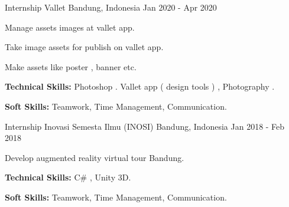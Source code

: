 \begin{cventries}
        
  \cventry
    {Internship} %
    {Vallet} %
    {Bandung, Indonesia} %
    {Jan 2020 - Apr 2020} %
    {
      \begin{cvitems} %
        \item {Manage assets images at vallet app.}
        \item {Take image assets for publish on vallet app.}
        \item {Make assets like poster , banner etc.}
        \item {\textbf{Technical Skills:} Photoshop . Vallet app ( design tools ) , Photography .}
        \item {\textbf{Soft Skills:} Teamwork, Time Management, Communication.}
      \end{cvitems}
    }
    
  \cventry
    {Internship} %
    {Inovasi Semesta Ilmu (INOSI)} %
    {Bandung, Indonesia} %
    {Jan 2018 - Feb 2018} %
    {
      \begin{cvitems} %
        \item {Develop augmented reality virtual tour Bandung.}
        \item {\textbf{Technical Skills:} C\#  , Unity 3D.}
        \item {\textbf{Soft Skills:} Teamwork, Time Management, Communication.}
      \end{cvitems}
    }

\end{cventries}

